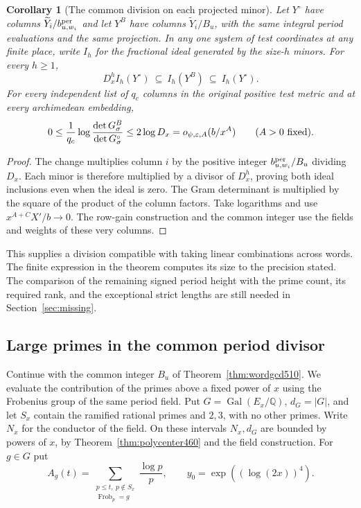 \documentclass[a4paper,11pt]{article}
\newtheorem{corollary}[proposition]{Corollary}
\theoremstyle{definition}
\theoremstyle{remark}
\numberwithin{equation}{section}
\begin{document}
\begin{corollary}[The common division on each projected minor]\leavevmode
\label{cor:commonminors510}
Let \(Y^\circ\) have columns \(\widetilde Y_i/b^{\rm per}_{u,w_i}\)
and let \(Y^B\) have columns \(\widetilde Y_i/B_u\), with the
same integral period evaluations and the same projection. In
any one system of test coordinates at any finite place, write
\(I_h\) for the fractional ideal generated by the size-\(h\)
minors. For every \(h\ge1\),
\[
   D_x^h I_h(Y^\circ)\ \subseteq\ I_h(Y^B)\
                                 \subseteq\ I_h(Y^\circ).
\]
For every independent list of \(q_c\) columns in the original
positive test metric and at every archimedean embedding,
\[
    0\le {1\over q_c}
       \log\frac{\det G^B_\sigma}{\det G^\circ_\sigma}
          \le 2\log D_x=o_{\psi,\varepsilon,A}(b/x^A)
                 \qquad (A>0\text{ fixed}).
\]
\end{corollary}
\begin{proof}
The change multiplies column \(i\) by the positive integer
\(b^{\rm per}_{u,w_i}/B_u\) dividing \(D_x\). Each minor is
therefore multiplied by a divisor of \(D_x^h\), proving both
ideal inclusions even when the ideal is zero. The Gram
determinant is multiplied by the square of the product of the
column factors. Take logarithms and use
\(x^{A+C}X'/b\to0\). The row-gain construction and the common
integer use the fields and weights of these very columns.
\end{proof}

This supplies a division compatible with taking linear
combinations across words. The finite expression in the theorem
computes its size to the precision stated. The comparison of
the remaining signed period height with the prime count, its
required rank, and the exceptional strict lengths are still
needed in Section~\ref{sec:missing}.


\subsection{Large primes in the common period divisor}
\label{sec:divprimes511}

Continue with the common integer \(B_u\) of
Theorem~\ref{thm:wordgcd510}. We evaluate the contribution of the
primes above a fixed power of \(x\) using the Frobenius group of
the same period field. Put \(G=\operatorname{Gal}(E_x/\mathbb Q)\),
\(d_G=|G|\), and let \(S_x\) contain the ramified rational primes
and \(2,3\), with no other primes. Write \(N_x\) for the conductor
of the field. On these intervals \(N_x,d_G\) are bounded by
powers of \(x\), by Theorem~\ref{thm:polycenter460} and the
field construction. For \(g\in G\) put
\[
 A_g(t)=\sum_{\substack{p\le t,\ p\notin S_x\\
                         \operatorname{Frob}_p=g}}\frac{\log p}{p},
                \qquad y_0=\exp((\log(2x))^4).
\]
\end{document}
